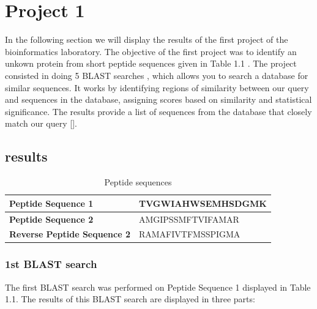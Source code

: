 \documentclass[a4paper,english,12pt,bibliography=totoc]{scrreprt}
\begin{document}

\chapter{Project 1}
In the following section we will display the results of the first project of the bioinformatics laboratory.
The objective of the first project was to identify an unkown protein from short peptide sequences given in Table 1.1 .
The project consisted in doing 5 BLAST searches , which allows you to search a database for similar sequences. It works by identifying regions of similarity between our query and sequences in the database, assigning scores based on similarity and statistical significance. The results provide a list of sequences from the database that closely match our query [\cite{altschul_basic_1990}].

\section{results}

\begin{table}[H]
\centering
\begin{tabular}{|l|l|}
\hline
\textbf{Peptide Sequence 1} & TVGWIAHWSEMHSDGMK \\
\hline
\textbf{Peptide Sequence 2} & AMGIPSSMFTVIFAMAR \\
\hline
\textbf{Reverse Peptide Sequence 2} & RAMAFIVTFMSSPIGMA \\
\hline
\end{tabular}
\caption{Peptide sequences}
\end{table}


\subsection{1st BLAST search }
The first BLAST search was performed on Peptide Sequence 1 displayed in Table 1.1.
The results of this BLAST search are displayed in three parts:
\end{document}
